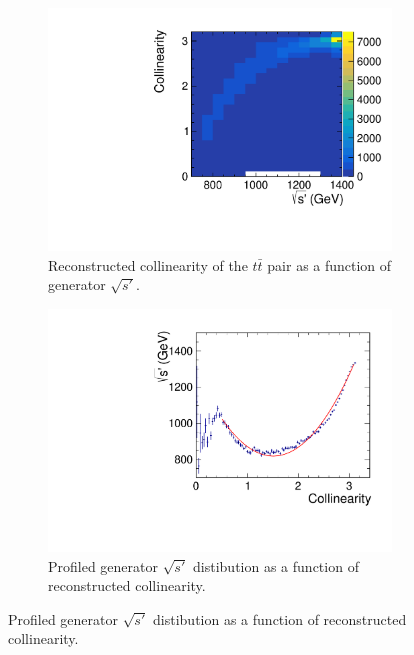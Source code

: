 \begin{figure}
  \begin{subfigure}{.5\textwidth}
    \centering
    \includegraphics[width=1.0\textwidth]{TopAnalysis/figures/ColVsE.pdf}
    \caption[Collinearity of $t\bar{t}$ pair]{Reconstructed collinearity of the $t\bar{t}$ pair as a function of generator $\sqrt{s'}$.}
    \label{fig:Collinearity}
  \end{subfigure}
  \begin{subfigure}{.5\textwidth}
    \centering
    \includegraphics[width=1.0\textwidth]{TopAnalysis/figures/CollinearityAlt.pdf}%
    \caption[Profiled $\sqrt{s'}$ distibution as a function of reconstructed collinearity]{Profiled generator $\sqrt{s'}$ distibution as a function of reconstructed collinearity.}
    \label{fig:CollinearityAlt}
  \end{subfigure}
\end{figure}

